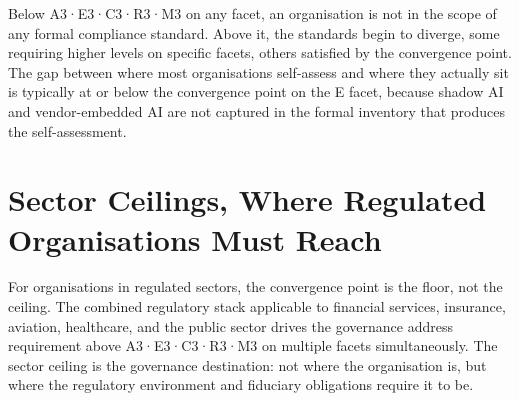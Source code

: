 Below A3·E3·C3·R3·M3 on any facet, an organisation is not in the scope of any formal compliance standard. Above it, the standards begin to diverge, some requiring higher levels on specific facets, others satisfied by the convergence point. The gap between where most organisations self-assess and where they actually sit is typically at or below the convergence point on the E facet, because shadow AI and vendor-embedded AI are not captured in the formal inventory that produces the self-assessment.

\scenebreak

\section{Sector Ceilings, Where Regulated Organisations Must Reach}

For organisations in regulated sectors, the convergence point is the floor, not the ceiling. The combined regulatory stack applicable to financial services, insurance, aviation, healthcare, and the public sector drives the governance address requirement above A3·E3·C3·R3·M3 on multiple facets simultaneously. The sector ceiling is the governance destination: not where the organisation is, but where the regulatory environment and fiduciary obligations require it to be.

